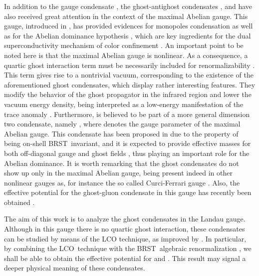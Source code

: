 \documentclass[a4paper,12pt]{article}
\begin{document}
In addition to the gauge condensate \coordHE{}, the
ghost-antighost condensates \coordHE{}, \coordHE{} and \coordHE{} have also received great attention \cite{ms,k,sp,dd,work} in
the context of the maximal Abelian gauge. This gauge, introduced in \cite
{th,ks}, has provided evidences for monopoles condensation as well as for
the Abelian dominance hypothesis \cite{th,abd}, which are key ingredients
for the dual superconductivity mechanism of color confinement \cite{scon,th}%
. An important point to be noted here is that the maximal Abelian gauge is
nonlinear. As a consequence, a quartic ghost interaction term must be
necessarily included for renormalizability \cite{mp,fz}. This term gives
rise to a nontrivial vacuum, corresponding to the existence of the
aforementioned ghost condensates, which display rather interesting features.
They modify the behavior of the ghost propagator in the infrared region \cite
{ms,k,sp} and lower the vacuum energy density, being interpreted as a
low-energy manifestation of the trace anomaly \cite{ms,k}. Furthermore, \coordHE{} is believed to be part of a more
general dimension two condensate, namely \coordHE{},
where \myHighlight{$\xi $}\coordHE{} denotes the gauge parameter of the maximal Abelian gauge. This
condensate has been proposed in \cite{ope} due to the property of being
on-shell BRST\ invariant, and it is expected to provide effective masses for
both off-diagonal gauge and ghost fields \cite{ope,dd}, thus playing an
important role for the Abelian dominance. It is worth remarking that the
ghost condensates do not show up only in the maximal Abelian gauge, being
present indeed in other nonlinear gauges as, for instance the so called
Curci-Ferrari gauge \cite{cf,cf1,cf2}. Also, the effective potential for the
ghost-gluon condensate \coordHE{} in this gauge has recently
been obtained  \cite{gg}.

The aim of this work is to analyze the ghost condensates in the Landau
gauge. Although in this gauge there is no quartic ghost interaction, these
condensates can be studied by means of the LCO technique, as improved by 
\cite{v2,v3}. In particular, by combining the LCO\ technique with the BRST\
algebraic renormalization \cite{book}, we shall be able to obtain the
effective potential for \myHighlight{$\left\langle cc\right\rangle $}\coordHE{} and \myHighlight{$\left\langle 
\overline{c}\overline{c}\right\rangle $}\coordHE{}. This result may signal a deeper
physical meaning of these condensates.
\end{document}
